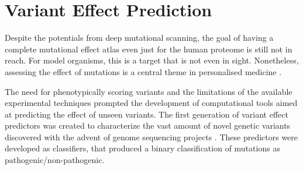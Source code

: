 \section{Variant Effect Prediction}
Despite the potentials from deep mutational scanning, the goal of having a complete mutational effect atlas even just for the human proteome is still not in reach.
For model organisms, this is a target that is not even in sight.
Nonetheless, assessing the effect of mutations is a central theme in personalised medicine \parencite{Goetz2018}.

The need for phenotypically scoring variants and the limitations of the available experimental techniques prompted the development of computational tools aimed at predicting the effect of unseen variants.
The first generation of variant effect predictors was created to characterize the vast amount of novel genetic variants discovered with the advent of genome sequencing projects \parencite{Collins1998,Ng2001,Ramensky2002}.
These predictors were developed as classifiers, that produced a binary classification of mutations as pathogenic/non-pathogenic.

